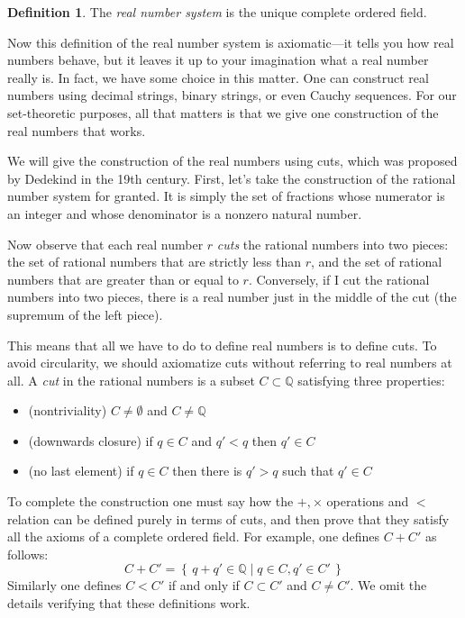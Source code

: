 \documentclass[11pt,oneside]{amsbook}
\newcommand{\set}[1]{\left\{\,#1\,\right\}}
\newcommand{\Q}{\mathbb Q}
\theoremstyle{definition}
\theoremstyle{plain}
\theoremstyle{definition}
\newtheorem{definition}[theorem]{Definition}
\theoremstyle{remark}
\numberwithin{equation}{section}
\numberwithin{figure}{section}
\begin{document}
\begin{definition}
  The \emph{real number system} is the unique complete ordered field. 
\end{definition}

Now this definition of the real number system is axiomatic---it tells you how real numbers behave, but it leaves it up to your imagination what a real number really is. In fact, we have some choice in this matter. One can construct real numbers using decimal strings, binary strings, or even Cauchy sequences. For our set-theoretic purposes, all that matters is that we give one construction of the real numbers that works.

We will give the construction of the real numbers using cuts, which was proposed by Dedekind in the 19th century. First, let's take the construction of the rational number system for granted. It is simply the set of fractions whose numerator is an integer and whose denominator is a nonzero natural number.

Now observe that each real number $r$ \emph{cuts} the rational numbers into two pieces: the set of rational numbers that are strictly less than $r$, and the set of rational numbers that are greater than or equal to $r$. Conversely, if I cut the rational numbers into two pieces, there is a real number just in the middle of the cut (the supremum of the left piece).

This means that all we have to do to define real numbers is to define cuts. To avoid circularity, we should axiomatize cuts without referring to real numbers at all. A \emph{cut} in the rational numbers is a subset $C\subset\Q$ satisfying three properties:

\begin{itemize}
  \item (nontriviality) $C\neq\emptyset$ and $C\neq\Q$
  \item (downwards closure) if $q\in C$ and $q'<q$ then $q'\in C$
  \item (no last element) if $q\in C$ then there is $q'>q$ such that $q'\in C$
\end{itemize}

To complete the construction one must say how the $+,\times$ operations and $<$ relation can be defined purely in terms of cuts, and then prove that they satisfy all the axioms of a complete ordered field. For example, one defines $C+C'$ as follows:
\[C+C'=\set{q+q'\in\Q\mid q\in C,q'\in C'}
\]
Similarly one defines $C<C'$ if and only if $C\subset C'$ and $C\neq C'$. We omit the details verifying that these definitions work.
\end{document}
